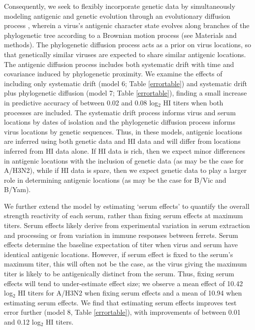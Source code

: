 \documentclass[11pt,oneside,letterpaper]{article}
\begin{document}
Consequently, we seek to flexibly incorporate genetic data by simultaneously modeling antigenic and genetic evolution through an evolutionary diffusion process \cite{Lemey10}, wherein a virus's antigenic character state evolves along branches of the phylogenetic tree according to a Brownian motion process (see Materials and methods).
The phylogenetic diffusion process acts as a prior on virus locations, so that genetically similar viruses are expected to share similar antigenic locations.
The antigenic diffusion process includes both systematic drift with time and covariance induced by phylogenetic proximity.
We examine the effects of including only systematic drift (model 6; Table \ref{errortable}) and systematic drift plus phylogenetic diffusion (model 7; Table \ref{errortable}), finding a small increase in predictive accuracy of between 0.02 and 0.08 log$_2$ HI titers when both processes are included.
The systematic drift process informs virus and serum locations by dates of isolation and the phylogenetic diffusion process informs virus locations by genetic sequences.
Thus, in these models, antigenic locations are inferred using both genetic data and HI data and will differ from locations inferred from HI data alone.
If HI data is rich, then we expect minor differences in antigenic locations with the inclusion of genetic data (as may be the case for A/H3N2), while if HI data is spare, then we expect genetic data to play a larger role in determining antigenic locations (as may be the case for B/Vic and B/Yam).

We further extend the model by estimating `serum effects' to quantify the overall strength reactivity of each serum, rather than fixing serum effects at maximum titers.
Serum effects likely derive from experimental variation in serum extraction and processing or from variation in immune responses between ferrets.
Serum effects determine the baseline expectation of titer when virus and serum have identical antigenic locations.
However, if serum effect is fixed to the serum's maximum titer, this will often not be the case, as the virus giving the maximum titer is likely to be antigenically distinct from the serum.
Thus, fixing serum effects will tend to under-estimate effect size; we observe a mean effect of 10.42 log$_2$ HI titers for A/H3N2 when fixing serum effects and a mean of 10.94 when estimating serum effects.
We find that estimating serum effects improves test error further (model 8, Table \ref{errortable}), with improvements of between 0.01 and 0.12 log$_2$ HI titers.
\end{document}

